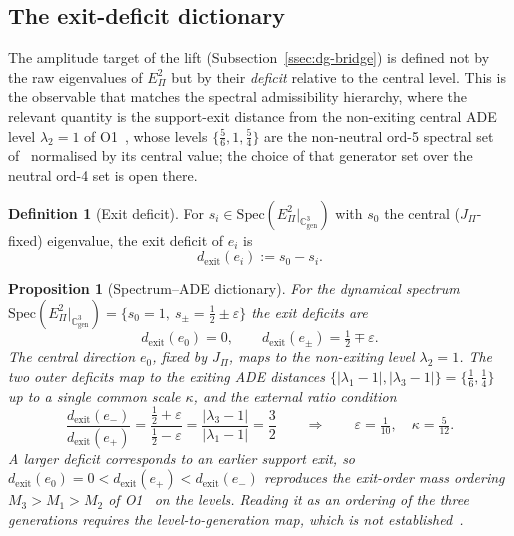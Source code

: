 \documentclass[11pt,a4paper]{article}
\newtheorem{proposition}[theorem]{Proposition}
\theoremstyle{definition}
\newtheorem{definition}[theorem]{Definition}
\theoremstyle{remark}
\begin{document}
  \subsection{The exit-deficit dictionary}
    \label{ssec:dg-dictionary}

    The amplitude target of the lift (Subsection~\ref{ssec:dg-bridge}) is defined not by the raw
    eigenvalues of $E_\Pi^2$ but by their \emph{deficit} relative to the central level.
    This is the observable that matches the spectral admissibility hierarchy, where the relevant
    quantity is the support-exit distance from the non-exiting central ADE level
    $\lambda_2 = 1$ of O1~\cite{Beau2026a6}, whose levels $\{\tfrac56, 1, \tfrac54\}$ are the
    non-neutral ord-5 spectral set of~\cite{Beau2026a4} normalised by its central value; the choice of
    that generator set over the neutral ord-4 set is open there.

    \begin{definition}[Exit deficit]
      \label{def:dg-exit-deficit}
      For $s_i \in \mathrm{Spec}(E_\Pi^2|_{\mathbb{C}^3_{\mathrm{gen}}})$ with $s_0$ the central
      ($J_\Pi$-fixed) eigenvalue, the exit deficit of $e_i$ is
      \[
        d_{\mathrm{exit}}(e_i) := s_0 - s_i .
      \]
    \end{definition}

    \begin{proposition}[Spectrum--ADE dictionary]
      \label{prop:dg-dictionary}
      For the dynamical spectrum
      $\mathrm{Spec}(E_\Pi^2|_{\mathbb{C}^3_{\mathrm{gen}}}) = \{s_0 = 1,\ s_\pm = \tfrac12 \pm
      \varepsilon\}$ the exit deficits are
      \[
        d_{\mathrm{exit}}(e_0) = 0, \qquad d_{\mathrm{exit}}(e_\pm) = \tfrac12 \mp \varepsilon .
      \]
      The central direction $e_0$, fixed by $J_\Pi$, maps to the non-exiting level $\lambda_2 = 1$.
      The two outer deficits map to the exiting ADE distances
      $\{|\lambda_1 - 1|, |\lambda_3 - 1|\} = \{\tfrac16, \tfrac14\}$ up to a single common scale
      $\kappa$, and the external ratio condition
      \[
        \frac{d_{\mathrm{exit}}(e_-)}{d_{\mathrm{exit}}(e_+)}
        = \frac{\tfrac12 + \varepsilon}{\tfrac12 - \varepsilon}
        = \frac{|\lambda_3 - 1|}{|\lambda_1 - 1|}
        = \frac32
        \qquad\Longrightarrow\qquad
        \varepsilon = \tfrac{1}{10}, \quad \kappa = \tfrac{5}{12} .
      \]
      A larger deficit corresponds to an earlier support exit, so
      $d_{\mathrm{exit}}(e_0) = 0 < d_{\mathrm{exit}}(e_+) < d_{\mathrm{exit}}(e_-)$ reproduces the
      exit-order mass ordering $M_3 > M_1 > M_2$ of O1~\cite{Beau2026a6} on the levels.
      Reading it as an ordering of the three generations requires the level-to-generation map, which
      is not established~\cite{Beau2026a6}.
    \end{proposition}
\end{document}
